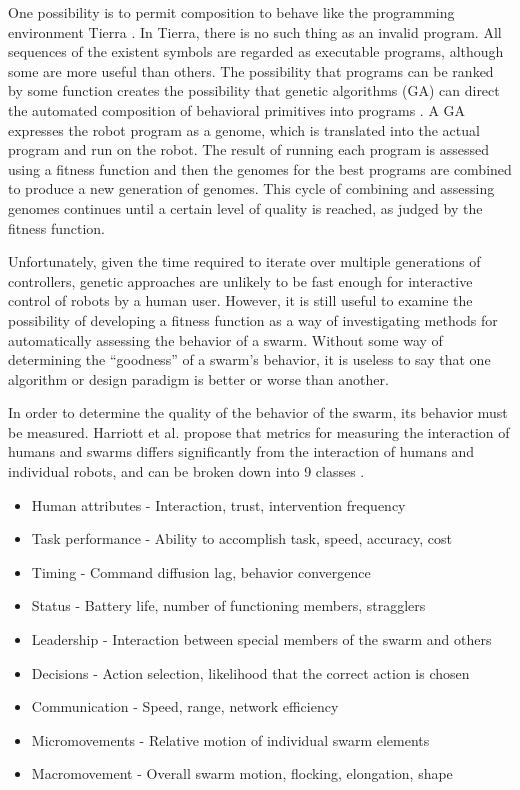 \documentclass[]{article}
\begin{document}
One possibility is to permit composition to behave like the programming environment Tierra \cite{ray1991approach}.
In Tierra, there is no such thing as an invalid program. 
All sequences of the existent symbols are regarded as executable programs, although some are more useful than others. 
The possibility that programs can be ranked by some function creates the possibility that genetic algorithms (GA) can direct the automated composition of behavioral primitives into programs \cite{palmer2005emergence}.
A GA expresses the robot program as a genome, which is translated into the actual program and run on the robot. 
The result of running each program is assessed using a fitness function and then the genomes for the best programs are combined to produce a new generation of genomes. 
This cycle of combining and assessing genomes continues until a certain level of quality is reached, as judged by the fitness function.

Unfortunately, given the time required to iterate over multiple generations of controllers, genetic approaches are unlikely to be fast enough for interactive control of robots by a human user. 
However, it is still useful to examine the possibility of developing a fitness function as a way of investigating methods for automatically assessing the behavior of a swarm.
Without some way of determining the ``goodness'' of a swarm's behavior, it is useless to say that one algorithm or design paradigm is better or worse than another. 

In order to determine the quality of the behavior of the swarm, its behavior must be measured.
Harriott et al. propose that metrics for measuring the interaction of humans and swarms differs significantly from the interaction of humans and individual robots, and can be broken down into 9 classes \cite{harriott2014biologically}. 
\begin{itemize}[noitemsep]
\item Human attributes - Interaction, trust, intervention frequency 
\item Task performance - Ability to accomplish task, speed, accuracy, cost
\item Timing - Command diffusion lag, behavior convergence
\item Status - Battery life, number of functioning members, stragglers
\item Leadership - Interaction between special members of the swarm and others
\item Decisions - Action selection, likelihood that the correct action is chosen
\item Communication - Speed, range, network efficiency
\item Micromovements - Relative motion of individual swarm elements
\item Macromovement - Overall swarm motion, flocking, elongation, shape 
\end{itemize}
\end{document}
